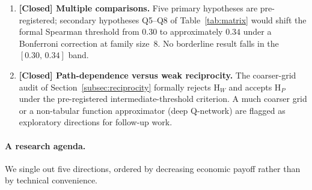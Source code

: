 \begin{enumerate}
  \item \textbf{[Closed] Multiple comparisons.} Five primary hypotheses
        are pre-registered; secondary hypotheses Q5--Q8 of
        Table~\ref{tab:matrix} would shift the formal Spearman
        threshold from $0.30$ to approximately $0.34$ under a
        Bonferroni correction at family size~$8$. No borderline
        result falls in the $[0.30,\,0.34]$ band.

  \item \textbf{[Closed] Path-dependence versus weak
        reciprocity.} The coarser-grid audit of
        Section~\ref{subsec:reciprocity} formally rejects
        H$_W$ and accepts H$_P$ under the pre-registered
        intermediate-threshold criterion. A much coarser grid
        or a non-tabular function approximator (deep Q-network)
        are flagged as exploratory directions for follow-up
        work.

\end{enumerate}

\paragraph{A research agenda.}
We single out five directions, ordered by decreasing economic
payoff rather than by technical convenience.

